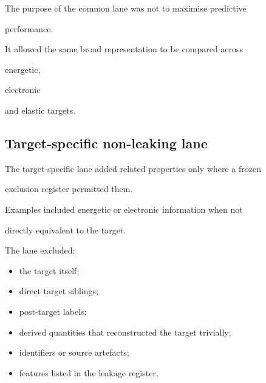 \documentclass[11pt,a4paper,oneside]{report}
\begin{document}
The purpose of the common lane was not to maximise predictive

performance.



It allowed the same broad representation to be compared across

energetic,

electronic

and elastic targets.





\subsection{Target-specific non-leaking lane}



The target-specific lane added related properties only where a frozen

exclusion register permitted them.



Examples included energetic or electronic information when not

directly equivalent to the target.



The lane excluded:



\begin{itemize}



\item

the target itself;



\item

direct target siblings;



\item

post-target labels;



\item

derived quantities that reconstructed the target trivially;



\item

identifiers or source artefacts;



\item

features listed in the leakage register.



\end{itemize}
\end{document}
